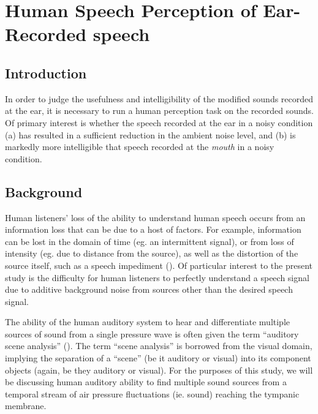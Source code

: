 \documentclass[dissertation,copyright]{uathesis}
\begin{document}


 



\chapter{Human Speech Perception of Ear-Recorded speech\label{chapter4}}


\section{Introduction}

In order to judge the usefulness and intelligibility of the modified sounds recorded at the ear, it is necessary to run a human perception task on the recorded sounds.  Of primary interest is whether the speech recorded at the ear in a noisy condition (a) has resulted in a sufficient reduction in the ambient noise level, and (b) is markedly more intelligible that speech recorded at the \textit{mouth} in a noisy condition.

\section{Background}\label{chap2:background}

Human listeners' loss of the ability to understand human speech occurs from an information loss that can be due to a host of factors.  For example, information can be lost in the domain of time (eg. an intermittent signal), or from loss of intensity (eg. due to distance from the source), as well as the distortion of the source itself, such as a speech impediment (\cite{mattys:12}).  Of particular interest to the present study is the difficulty for human listeners to perfectly understand a speech signal due to additive background noise from sources other than the desired speech signal.

The ability of the human auditory system to hear and differentiate multiple sources of sound from a single pressure wave is often given the term ``auditory scene analysis'' (\cite{bregman:94}).  The term ``scene analysis'' is borrowed from the visual domain, implying the separation of a ``scene'' (be it auditory or visual) into its component objects (again, be they auditory or visual). For the purposes of this study, we will be discussing human auditory ability to find multiple sound sources from a temporal stream of air pressure fluctuations (ie. sound) reaching the tympanic membrane.
\end{document}
